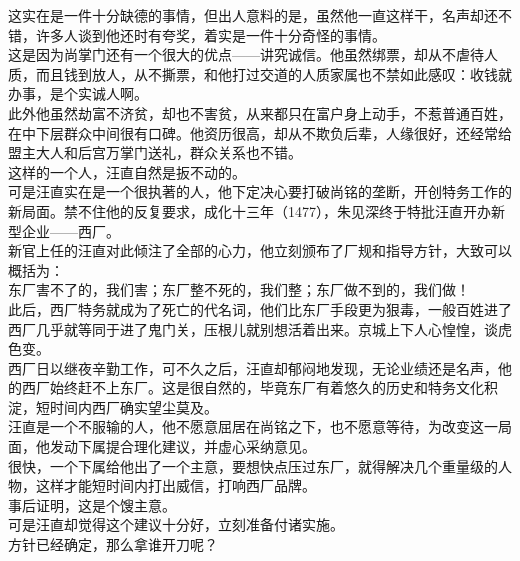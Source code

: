 \begin{multicols}{\theparacolNo}
这实在是一件十分缺德的事情，但出人意料的是，虽然他一直这样干，名声却还不错，许多人谈到他还时有夸奖，着实是一件十分奇怪的事情。\\

这是因为尚掌门还有一个很大的优点——讲究诚信。他虽然绑票，却从不虐待人质，而且钱到放人，从不撕票，和他打过交道的人质家属也不禁如此感叹：收钱就办事，是个实诚人啊。\\

此外他虽然劫富不济贫，却也不害贫，从来都只在富户身上动手，不惹普通百姓，在中下层群众中间很有口碑。他资历很高，却从不欺负后辈，人缘很好，还经常给盟主大人和后宫万掌门送礼，群众关系也不错。\\

这样的一个人，汪直自然是扳不动的。\\

可是汪直实在是一个很执著的人，他下定决心要打破尚铭的垄断，开创特务工作的新局面。禁不住他的反复要求，成化十三年（1477），朱见深终于特批汪直开办新型企业——西厂。\\

新官上任的汪直对此倾注了全部的心力，他立刻颁布了厂规和指导方针，大致可以概括为：\\

东厂害不了的，我们害；东厂整不死的，我们整；东厂做不到的，我们做！\\

此后，西厂特务就成为了死亡的代名词，他们比东厂手段更为狠毒，一般百姓进了西厂几乎就等同于进了鬼门关，压根儿就别想活着出来。京城上下人心惶惶，谈虎色变。\\

西厂日以继夜辛勤工作，可不久之后，汪直却郁闷地发现，无论业绩还是名声，他的西厂始终赶不上东厂。这是很自然的，毕竟东厂有着悠久的历史和特务文化积淀，短时间内西厂确实望尘莫及。\\

汪直是一个不服输的人，他不愿意屈居在尚铭之下，也不愿意等待，为改变这一局面，他发动下属提合理化建议，并虚心采纳意见。\\

很快，一个下属给他出了一个主意，要想快点压过东厂，就得解决几个重量级的人物，这样才能短时间内打出威信，打响西厂品牌。\\

事后证明，这是个馊主意。\\

可是汪直却觉得这个建议十分好，立刻准备付诸实施。\\

方针已经确定，那么拿谁开刀呢？\\


\end{multicols}

